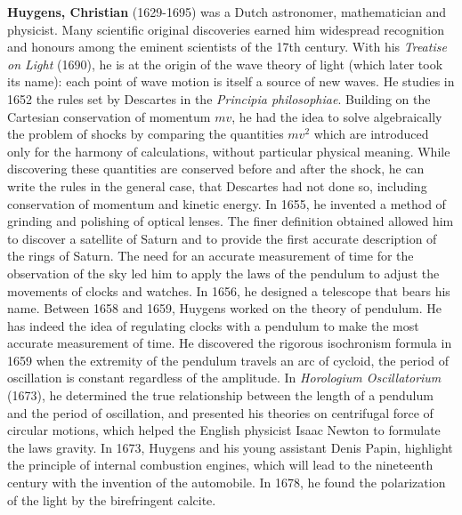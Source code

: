 \textbf{Huygens, Christian} (1629-1695) was a Dutch astronomer, mathematician and physicist. Many scientific original discoveries earned him widespread recognition and honours among the eminent scientists of the 17th century. With his \textit{Treatise on Light} (1690), he is at the origin of the wave theory of light (which later took its name): each point of wave motion is itself a source of new waves. He studies in 1652 the rules set by Descartes in the \textit{ Principia philosophiae}. Building on the Cartesian conservation of momentum $mv$, he had the idea to solve algebraically the problem of shocks by comparing the quantities $mv^2$ which are introduced only for the harmony of calculations, without particular physical meaning. While discovering these quantities are conserved before and after the shock, he can write the rules in the general case, that Descartes had not done so, including conservation of momentum and kinetic energy. In 1655, he invented a method of grinding and polishing of optical lenses. The finer definition obtained allowed him to discover a satellite of Saturn and to provide the first accurate description of the rings of Saturn. The need for an accurate measurement of time for the observation of the sky led him to apply the laws of the pendulum to adjust the movements of clocks and watches. In 1656, he designed a telescope that bears his name. Between 1658 and 1659, Huygens worked on the theory of pendulum. He has indeed the idea of regulating clocks with a pendulum to make the most accurate measurement of time. He discovered the rigorous isochronism formula in 1659 when the extremity of the pendulum travels an arc of cycloid, the period of oscillation is constant regardless of the amplitude. In \textit{Horologium Oscillatorium} (1673), he determined the true relationship between the length of a pendulum and the period of oscillation, and presented his theories on centrifugal force of circular motions, which helped the English physicist Isaac Newton to formulate the laws gravity. In 1673, Huygens and his young assistant Denis Papin, highlight the principle of internal combustion engines, which will lead to the nineteenth century with the invention of the automobile. In 1678, he found the polarization of the light by the birefringent calcite.

{}
\label{sec:I}

